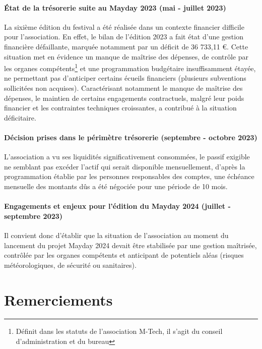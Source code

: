 \documentclass[12pt,a4paper]{report}
\begin{document}
\paragraph*{État de la trésorerie suite au Mayday 2023 (mai - juillet 2023)}
La sixième édition du festival a été réalisée dans un contexte financier difficile pour l’association. En effet, le bilan de l'édition 2023 a fait état d'une gestion financière défaillante, marquée notamment par un déficit de 36 733,11 €. Cette situation met en évidence un manque de maîtrise des dépenses, de contrôle par les organes compétents\footnote{Définit dans les statuts de l'association M-Tech, il s'agit du conseil d'administration et du bureau} et une programmation budgétaire insuffisamment étayée, ne permettant pas d'anticiper certains écueils financiers (plusieurs subventions sollicitées non acquises). Caractérisant notamment le manque de maîtrise des dépenses, le maintien de certains engagements contractuels, malgré leur poids financier et les contraintes techniques croissantes, a contribué à la situation déficitaire.

\paragraph*{Décision prises dans le périmètre trésorerie (septembre - octobre 2023)}
L'association a vu ses liquidités significativement consommées, le passif exigible ne semblant pas excéder l'actif qui serait disponible mensuellement, d'après la programmation établie par les personnes responsables des comptes, une échéance mensuelle des montants dûs a été négociée pour une période de 10 mois.

\paragraph*{Engagements et enjeux pour l'édition du Mayday 2024 (juillet - septembre 2023)}
Il convient donc d'établir que la situation de l'association au moment du lancement du projet \og Mayday 2024 \fg{}  devait être stabilisée par une gestion maîtrisée, contrôlée par les organes compétents et anticipant de potentiels aléas (risques météorologiques, de sécurité ou sanitaires).

\newpage
\section*{Remerciements}
\end{document}
